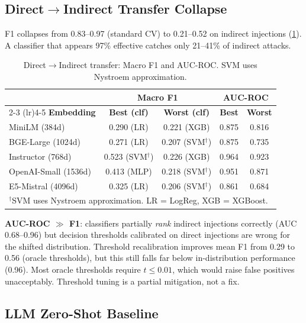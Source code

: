 \documentclass[11pt,a4paper]{article}
\newcommand{\Fone}{F1}
\begin{document}
\subsection{Direct$\to$Indirect Transfer Collapse}
\label{sec:transfer}

\Fone{} collapses from 0.83--0.97 (standard CV) to 0.21--0.52 on indirect
injections (\cref{tab:transfer}). A classifier that appears 97\% effective
catches only 21--41\% of indirect attacks.

\begin{table}[t]
\centering
\small
\caption{Direct$\to$Indirect transfer: Macro \Fone{} and AUC-ROC. SVM uses
  Nystroem approximation.}
\label{tab:transfer}
\begin{tabular}{lcccc}
\toprule
& \multicolumn{2}{c}{\textbf{Macro \Fone{}}} & \multicolumn{2}{c}{\textbf{AUC-ROC}} \\
\cmidrule(lr){2-3} \cmidrule(lr){4-5}
\textbf{Embedding} & \textbf{Best (clf)} & \textbf{Worst (clf)} & \textbf{Best} & \textbf{Worst} \\
\midrule
MiniLM (384d) & 0.290 (LR) & 0.221 (XGB) & 0.875 & 0.816 \\
BGE-Large (1024d) & 0.271 (LR) & 0.207 (SVM$^\dagger$) & 0.875 & 0.735 \\
Instructor (768d) & 0.523 (SVM$^\dagger$) & 0.226 (XGB) & 0.964 & 0.923 \\
OpenAI-Small (1536d) & 0.413 (MLP) & 0.218 (SVM$^\dagger$) & 0.951 & 0.871 \\
E5-Mistral (4096d) & 0.325 (LR) & 0.206 (SVM$^\dagger$) & 0.861 & 0.684 \\
\bottomrule
\multicolumn{5}{l}{\footnotesize $^\dagger$SVM uses Nystroem approximation.
  LR = LogReg, XGB = XGBoost.}
\end{tabular}
\end{table}

\textbf{AUC-ROC $\gg$ \Fone{}}: classifiers partially \emph{rank} indirect
injections correctly (AUC 0.68--0.96) but decision thresholds calibrated on
direct injections are wrong for the shifted distribution. Threshold
recalibration improves mean \Fone{} from 0.29 to 0.56 (oracle thresholds), but
this still falls far below in-distribution performance (0.96). Most oracle
thresholds require $t \leq 0.01$, which would raise false positives
unacceptably. Threshold tuning is a partial mitigation, not a fix.

\subsection{LLM Zero-Shot Baseline}
\end{document}
